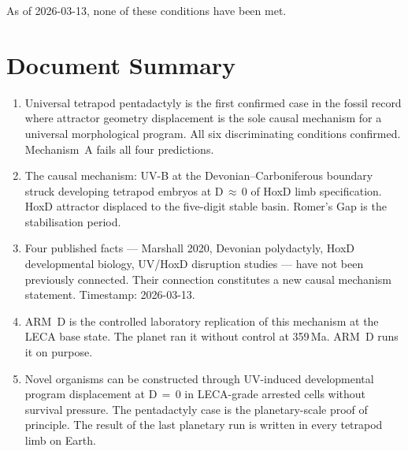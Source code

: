 \documentclass[11pt, a4paper]{article}
\begin{document}
As of 2026-03-13, none of these conditions have
been met.

\section{Document Summary}

\begin{enumerate}[leftmargin=*, label=(\arabic*)]
\item Universal tetrapod pentadactyly is the
  first confirmed case in the fossil record where
  attractor geometry displacement is the sole
  causal mechanism for a universal morphological
  program. All six discriminating conditions
  confirmed. Mechanism~A fails all four predictions.

\item The causal mechanism: UV-B at the
  Devonian--Carboniferous boundary struck developing
  tetrapod embryos at D\,$\approx$\,0 of HoxD limb
  specification. HoxD attractor displaced to the
  five-digit stable basin. Romer's Gap is the
  stabilisation period.

\item Four published facts --- Marshall 2020,
  Devonian polydactyly, HoxD developmental biology,
  UV/HoxD disruption studies --- have not been
  previously connected. Their connection constitutes
  a new causal mechanism statement. Timestamp:
  2026-03-13.

\item ARM~D is the controlled laboratory replication
  of this mechanism at the LECA base state.
  The planet ran it without control at 359\,Ma.
  ARM~D runs it on purpose.

\item Novel organisms can be constructed through
  UV-induced developmental program displacement
  at D\,$=$\,0 in LECA-grade arrested cells without
  survival pressure. The pentadactyly case is the
  planetary-scale proof of principle.
  The result of the last planetary run is written
  in every tetrapod limb on Earth.
\end{enumerate}
\end{document}
